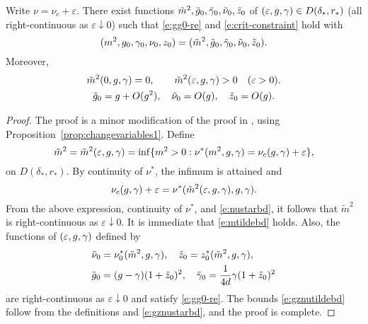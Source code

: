 \begin{prop}
\label{prop:changevariables2}
Write $\nu = \nu_c + \varepsilon$.
There exist functions $\tilde m^2, \tilde {g}_0, \tilde\gamma_0, \tilde\nu_0, \tilde z_0$
of $(\varepsilon, g, \gamma) \in D(\delta_*, r_*)$
(all right-continuous as $\varepsilon\downarrow 0$)
such that \eqref{e:gg0-re} and \eqref{e:crit-constraint} hold with
\begin{equation}
(m^2, g_0, \gamma_0, \nu_0, z_0) = (\tilde m^2, \tilde {g}_0, \tilde\gamma_0, \tilde\nu_0, \tilde z_0).
\end{equation}
Moreover,
\begin{gather}
\label{e:mtildebd}
\tilde m^2(0, g, \gamma) = 0,
		\qquad
\tilde m^2(\varepsilon, g, \gamma) > 0
		\quad
(\varepsilon > 0). \\
\label{e:gznutildebd}
\tilde {g}_0 = g + O(g^2),
		\quad
\tilde \nu_0 = O(g),
		\quad
\tilde z_0 = O(g).
\end{gather}
\end{prop}

\begin{proof}
The proof is a minor modification of the proof in \cite{BBS-saw4-log},
using Proposition~\ref{prop:changevariables1}.
Define
\begin{equation}
\label{e:mtildef}
\tilde m^2
		=
\tilde m^2 (\varepsilon,g,\gamma)
		=
\inf \{m^2 > 0 : \nu^*(m^2, g, \gamma) = \nu_c(g, \gamma) + \varepsilon \},
\end{equation}
on $D(\delta_*, r_*)$. By continuity of $\nu^*$, the infimum is attained and
\begin{equation}
\nu_c(g, \gamma) + \varepsilon
	=
\nu^*(\tilde m^2(\varepsilon, g, \gamma), g, \gamma).
\end{equation}
From the above expression, continuity of $\nu^*$, and \eqref{e:nustarbd},
it follows that $\tilde m^2$ is right-continuous as $\varepsilon\downarrow 0$.
It is immediate that \eqref{e:mtildebd} holds.
Also, the functions of $(\varepsilon,g,\gamma)$ defined by
\begin{align}
&\tilde\nu_0 = \nu_0^*(\tilde m^2, g, \gamma), \quad
\tilde z_0 = z_0^*(\tilde m^2, g, \gamma), \\
&\tilde {g}_0 = (g - \gamma) (1 + \tilde z_0)^2 ,\quad
\tilde\gamma_0 = \frac{1}{4d} \gamma (1 + \tilde z_0)^2
\end{align}
are right-continuous as $\varepsilon \downarrow 0$ and satisfy \eqref{e:gg0-re}.
The bounds \eqref{e:gznutildebd} follow from the definitions
and \eqref{e:gznustarbd}, and the proof is complete.
\end{proof}

